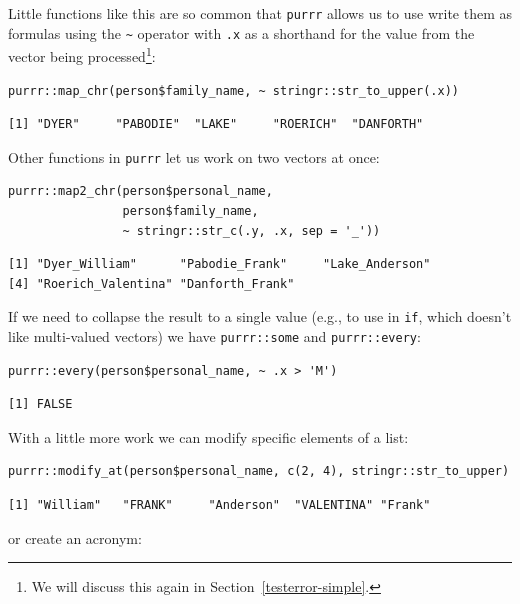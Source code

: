 Little functions like this are so common
that \texttt{purrr} allows us to use write them as formulas
using the \texttt{\textasciitilde} operator
with \texttt{.x} as a shorthand for the value from the vector
being processed\footnote{We will discuss this again in Section~\ref{testerror-simple}.}:

\begin{lstlisting}
purrr::map_chr(person$family_name, ~ stringr::str_to_upper(.x))
\end{lstlisting}

\begin{lstlisting}
[1] "DYER"     "PABODIE"  "LAKE"     "ROERICH"  "DANFORTH"
\end{lstlisting}

\noindent
Other functions in \texttt{purrr} let us work on two vectors at once:

\begin{lstlisting}
purrr::map2_chr(person$personal_name,
                person$family_name,
                ~ stringr::str_c(.y, .x, sep = '_'))
\end{lstlisting}

\begin{lstlisting}
[1] "Dyer_William"      "Pabodie_Frank"     "Lake_Anderson"    
[4] "Roerich_Valentina" "Danforth_Frank"   
\end{lstlisting}

If we need to collapse the result to a single value
(e.g., to use in \texttt{if}, which doesn't like multi-valued vectors)
we have \texttt{purrr::some} and \texttt{purrr::every}:

\begin{lstlisting}
purrr::every(person$personal_name, ~ .x > 'M')
\end{lstlisting}

\begin{lstlisting}
[1] FALSE
\end{lstlisting}

With a little more work we can modify specific elements of a list:

\begin{lstlisting}
purrr::modify_at(person$personal_name, c(2, 4), stringr::str_to_upper)
\end{lstlisting}

\begin{lstlisting}
[1] "William"   "FRANK"     "Anderson"  "VALENTINA" "Frank"    
\end{lstlisting}

\noindent
or create an acronym:

